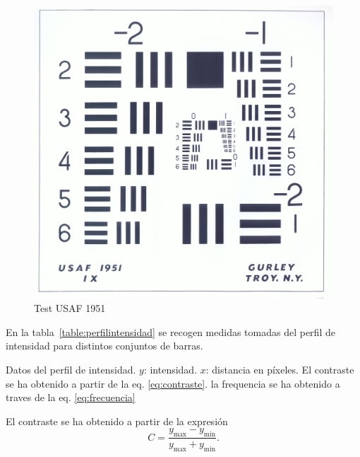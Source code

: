 \documentclass{./packages/optica-article}
\begin{document}
\begin{figure}[htbp]
	\centering
	\includegraphics[scale=0.05]{testusaf1951}
	\caption{Test USAF 1951}\label{fig:usaf1951}
\end{figure}

En la tabla~\ref{table:perfilintensidad} se recogen medidas tomadas del perfil de intensidad para distintos conjuntos de barras.

\begin{table}[p]
	\centering
	\caption{Datos del perfil de intensidad. $y$: intensidad. $x$: distancia en píxeles. El contraste se ha obtenido a partir de la eq. \ref{eq:contraste}. la frequencia se ha obtenido a traves de la eq. \ref{eq:frecuencia}}%
	\label{table:perfilintensidad}
\end{table}

El contraste se ha obtenido a partir de la expresión
\nolinebreak
\begin{equation}
	C = \frac{y_{\max} - y_{\min}}{y_{\max} + y_{\min}}.
	\label{eq:contraste}
\end{equation}
\end{document}
